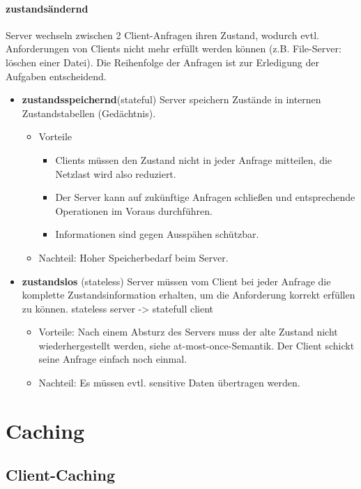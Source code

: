 \documentclass[a4paper]{article}
\begin{document}
		\paragraph{zustandsändernd} Server wechseln zwischen 2 Client-Anfragen ihren Zustand, wodurch evtl. Anforderungen von Clients nicht mehr erfüllt werden können (z.B. File-Server: löschen einer Datei). Die Reihenfolge der Anfragen ist zur Erledigung der Aufgaben entscheidend.
			\begin{itemize}
				\item \textbf{zustandsspeichernd}(stateful) Server speichern Zustände in internen Zustandstabellen (Gedächtnis).
				\begin{itemize}
					\item Vorteile
						\begin{itemize}
							\item Clients müssen den Zustand nicht in jeder 	Anfrage mitteilen, die Netzlast wird also reduziert.
							\item Der Server kann auf zukünftige Anfragen schließen und entsprechende Operationen im Voraus durchführen.
							\item Informationen sind gegen Ausspähen schützbar.
						\end{itemize}
					\item Nachteil: Hoher Speicherbedarf beim Server.
				\end{itemize}
				\item \textbf{zustandslos} (stateless) Server müssen vom Client bei jeder Anfrage die komplette Zustandsinformation erhalten, um die Anforderung korrekt erfüllen zu können. stateless server -> statefull client
				\begin{itemize}
					\item Vorteile: Nach einem Absturz des Servers muss der alte Zustand nicht wiederhergestellt werden, siehe at-most-once-Semantik. Der Client schickt seine Anfrage einfach noch einmal.
					\item Nachteil: Es müssen evtl. sensitive Daten übertragen werden.
				\end{itemize}
			\end{itemize}
\pagebreak
\section{Caching}
	\subsection{Client-Caching}
\end{document}
